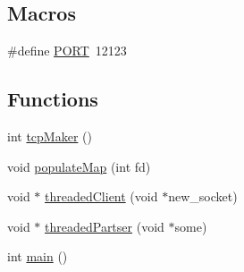 \subsection*{Macros}
\begin{DoxyCompactItemize}
\item 
\#define \hyperlink{serverAndParcer_8c_09_09_a614217d263be1fb1a5f76e2ff7be19a2}{P\+O\+RT}~12123
\end{DoxyCompactItemize}
\subsection*{Functions}
\begin{DoxyCompactItemize}
\item 
int \hyperlink{serverAndParcer_8c_09_09_a7cb86f6d733933107288b77527664613}{tcp\+Maker} ()
\item 
void \hyperlink{serverAndParcer_8c_09_09_a7410e9339d1139f46f6472c89222bb10}{populate\+Map} (int fd)
\item 
void $\ast$ \hyperlink{serverAndParcer_8c_09_09_a70874537694e95af79420af29ff34ae6}{threaded\+Client} (void $\ast$new\+\_\+socket)
\item 
void $\ast$ \hyperlink{serverAndParcer_8c_09_09_a51a231661435c593eb42172ed608fdb6}{threaded\+Partser} (void $\ast$some)
\item 
int \hyperlink{serverAndParcer_8c_09_09_ae66f6b31b5ad750f1fe042a706a4e3d4}{main} ()
\end{DoxyCompactItemize}
